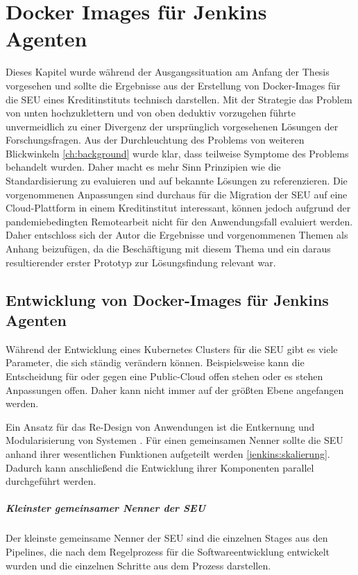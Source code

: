 \chapter{Docker Images für Jenkins Agenten}
\label{appendix:docker}
Dieses Kapitel wurde während der Ausgangssituation am Anfang der Thesis vorgesehen und sollte die Ergebnisse aus der Erstellung von Docker-Images für die \ac{SEU} eines Kreditinstituts technisch darstellen. Mit der Strategie das Problem von unten hochzuklettern und von oben deduktiv vorzugehen führte unvermeidlich zu einer Divergenz der ursprünglich vorgesehenen Lösungen der Forschungsfragen. Aus der Durchleuchtung des Problems von weiteren Blickwinkeln \ref{ch:background} wurde klar, dass teilweise Symptome des Problems behandelt wurden. Daher macht es mehr Sinn Prinzipien wie die Standardisierung zu evaluieren und auf bekannte Lösungen zu referenzieren. Die vorgenommenen Anpassungen sind durchaus für die Migration der \ac{SEU} auf eine Cloud-Plattform in einem Kreditinstitut interessant, können jedoch aufgrund der pandemiebedingten Remotearbeit nicht für den Anwendungsfall evaluiert werden. Daher entschloss sich der Autor die Ergebnisse und vorgenommenen Themen als Anhang beizufügen, da die Beschäftigung mit diesem Thema und ein daraus resultierender erster Prototyp zur Lösungsfindung relevant war.


\section{Entwicklung von Docker-Images für Jenkins Agenten}

Während der Entwicklung eines Kubernetes Clusters für die \ac{SEU} gibt es viele Parameter, die sich ständig verändern können. Beispielsweise kann die Entscheidung für oder gegen eine Public-Cloud offen stehen oder es stehen Anpassungen offen. Daher kann nicht immer auf der größten Ebene angefangen werden.

Ein Ansatz für das Re-Design von Anwendungen ist die Entkernung und Modularisierung von Systemen \cite{Bussmann2006}.
Für einen gemeinsamen Nenner sollte die \ac{SEU} anhand ihrer wesentlichen Funktionen aufgeteilt werden \ref{jenkins:skalierung}. Dadurch kann anschließend die Entwicklung ihrer Komponenten parallel durchgeführt werden. 

\paragraph{Kleinster gemeinsamer Nenner der SEU}
Der kleinste gemeinsame Nenner der \ac{SEU} sind die einzelnen Stages aus den Pipelines, die nach dem Regelprozess für die Softwareentwicklung entwickelt wurden und die einzelnen Schritte aus dem Prozess darstellen.

